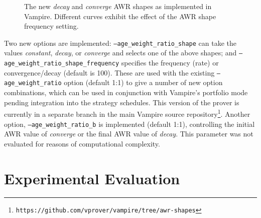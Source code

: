 \documentclass{llncs}
\begin{document}
\begin{figure}[t]
	\caption{The new \emph{decay} and \emph{converge} AWR shapes as implemented in Vampire. Different curves exhibit the effect of the AWR shape frequency setting.}
	\label{fig:decay-and-converge}
\end{figure}

Two new options are implemented: \texttt{--age\_weight\_ratio\_shape} can take the values \emph{constant}, \emph{decay}, or \emph{converge} and selects one of the above shapes; and \texttt{--age\_weight\_ratio\_shape\_frequency} specifies the frequency (rate) or convergence/decay (default is 100). These are used with the existing \texttt{--age\_weight\_ratio} option (default 1:1) to give a number of new option combinations, which can be used in conjunction with Vampire's portfolio mode pending integration into the strategy schedules.
This version of the prover is currently in a separate branch in the main Vampire source repository\footnote{\texttt{https://github.com/vprover/vampire/tree/awr-shapes}}.
Another option, \texttt{--age\_weight\_ratio\_b} is implemented (default 1:1), controlling the initial AWR value of \emph{converge} or the final AWR value of \emph{decay}.
This parameter was not evaluated for reasons of computational complexity.

\section{Experimental Evaluation}
\label{sec:experiments}
\end{document}
